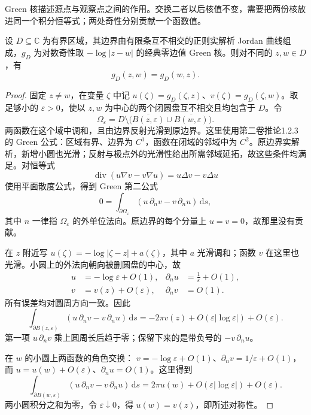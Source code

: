 Green 核描述源点与观察点之间的作用。交换二者以后核值不变，需要把两份核放进同一个积分恒等式；两处奇性分别贡献一个函数值。

\begin{proposition}\label{b3:prop:17-green-symmetry}
设 \(D\subseteq\mathbb C\) 为有界区域，其边界由有限条互不相交的正则实解析 Jordan 曲线组成，\(g_D\) 为对数奇性取 \(-\log|z-w|\) 的经典零边值 Green 核。则对不同的 \(z,w\in D\)，有
\[
 g_D(z,w)=g_D(w,z).
\]
\end{proposition}
\begin{proof}
固定 \(z\ne w\)，在变量 \(\zeta\) 中记
\(u(\zeta)=g_D(\zeta,z)\)、\(v(\zeta)=g_D(\zeta,w)\)。取足够小的
\(\varepsilon>0\)，使以 \(z,w\) 为中心的两个闭圆盘互不相交且均包含于
\(D\)。令
\[
 \Omega_\varepsilon
 =D\setminus\bigl(\overline{B(z,\varepsilon)}
                  \cup\overline{B(w,\varepsilon)}\bigr).
\]
两函数在这个域中调和，且由边界反射光滑到原边界。这里使用第二卷推论1.2.3的 Green 公式：区域有界、边界为 \(C^1\)，函数在闭域的邻域中为 \(C^2\)。原边界实解析，新增小圆也光滑；反射与极点外的光滑性给出所需邻域延拓，故这些条件均满足。对恒等式
\[
 \operatorname{div}(u\nabla v-v\nabla u)=u\Delta v-v\Delta u
\]
使用平面散度公式，得到 Green 第二公式
\[
 0=\int_{\partial\Omega_\varepsilon}
       (u\,\partial_nv-v\,\partial_nu)\,\mathrm ds,
\]
其中 \(n\) 一律指 \(\Omega_\varepsilon\) 的外单位法向。原边界的每个分量上
\(u=v=0\)，故那里没有贡献。

在 \(z\) 附近写 \(u(\zeta)=-\log|\zeta-z|+a(\zeta)\)，其中 \(a\) 光滑调和；函数 \(v\) 在这里也光滑。小圆上的外法向朝向被删圆盘的中心，故
\[
 \begin{aligned}
 u&=-\log\varepsilon+O(1),&
 \partial_nu&=\frac1\varepsilon+O(1),\\
 v&=v(z)+O(\varepsilon),&
 \partial_nv&=O(1).
 \end{aligned}
\]
所有误差均对圆周方向一致。因此
\[
 \int_{\partial B(z,\varepsilon)}
       (u\,\partial_nv-v\,\partial_nu)\,\mathrm ds
 =-2\pi v(z)+O(\varepsilon|\log\varepsilon|)+O(\varepsilon).
\]
第一项 \(u\,\partial_nv\) 乘上圆周长后趋于零；保留下来的是带负号的
\(-v\,\partial_nu\)。

在 \(w\) 的小圆上两函数的角色交换：
\(v=-\log\varepsilon+O(1)\)、\(\partial_nv=1/\varepsilon+O(1)\)，而
\(u=u(w)+O(\varepsilon)\)、\(\partial_nu=O(1)\)。这里得到
\[
 \int_{\partial B(w,\varepsilon)}
       (u\,\partial_nv-v\,\partial_nu)\,\mathrm ds
 =2\pi u(w)+O(\varepsilon|\log\varepsilon|)+O(\varepsilon).
\]
两小圆积分之和为零，令 \(\varepsilon\downarrow0\)，得
\(u(w)=v(z)\)，即所述对称性。
\end{proof}

